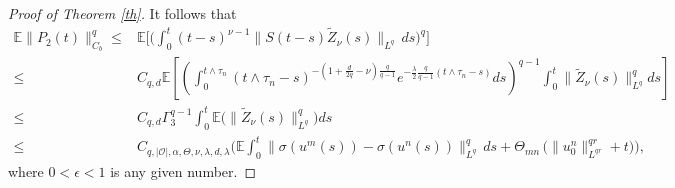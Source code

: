 \documentclass[10pt]{article}
\numberwithin{figure}{section}
\numberwithin{equation}{section}
\newcommand{\0}{{\theta}}
\def\be{\begin{equation}}
\def\ee{\end{equation}}
\def\lam{\lambda}
\def\~{\tilde}
\def\E{\mathbb{E}}
\def\[{\left[}\def\]{\right]}
\def\({\left(}\def\){\right)}
\begin{document}
\begin{proof}[Proof of Theorem \ref{th}]
It follows that \be\label{eq3.19}
\begin{aligned}
\E\|P_2(t)\|_{C_b}^q
\le& \E\Big[\Big(\int_0^{t}(t-s)^{\nu-1}
\|S(t-s)\~Z_\nu(s)\|_{L^q}\,ds\Big)^q\Big] \\
\le&C_{q,d}\E\[\(\int_0^{t\wedge\tau_n}(t\wedge\tau_n-s)^{-(1+\frac{d}{2q}-\nu)\frac{q}{q-1}}e^{-\frac{\lam}{2}\frac{q}{q-1}(t\wedge\tau_n-s)}ds\)^{q-1}\int_0^t\|\~Z_\nu(s)\|_{L^q}^qds\]\\
\le&C_{q,d}\Gamma_3^{q-1}\int_0^t\E\big(\|\~Z_\nu(s)\|_{L^q}^q\big)ds\\
\le& C_{q,|\mathcal{O}|,\alpha,\Theta,\nu,\lam,d,\lam}\Big(\E\int_0^t \| \sigma(u^m(s)) - \sigma(u^n(s)) \|_{L^q}^q \, ds+\Theta_{mn}\,
        \big(\|u_0^n\|_{L^{qr}}^{qr}+t \big)\Big),
\end{aligned}
\ee
where $0<\epsilon<1$ is any given number.


\end{proof}
\end{document}
